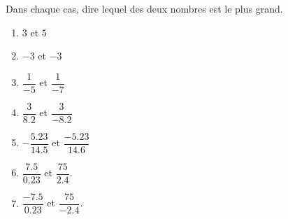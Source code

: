 
\begin{exercice}\label{exo2smath-0024}

Dans chaque cas, dire lequel des deux nombres est le plus grand.
\begin{multicols}{2}
    \begin{enumerate}
        \item
            \( 3\) et \( 5\)
        \item
            \( -3\) et \( -3\)
        \item
            \( \dfrac{ 1 }{ -5 }\) et \( \dfrac{ 1 }{ -7 }\)
        \item
            \( \dfrac{ 3 }{ 8.2 }\) et \( \dfrac{ 3 }{ -8.2 }\)
        \item
            \( -\dfrac{ 5.23 }{ 14.5 }\) et \( \dfrac{ -5.23 }{ 14.6 }\)
        \item
            \( \dfrac{ 7.5 }{ 0.23 }\) et \( \dfrac{ 75 }{ 2.4 }\).
        \item
            \( \dfrac{ -7.5 }{ 0.23 }\) et \( \dfrac{ 75 }{ -2.4 }\).
    \end{enumerate}
\end{multicols}

\end{exercice}
